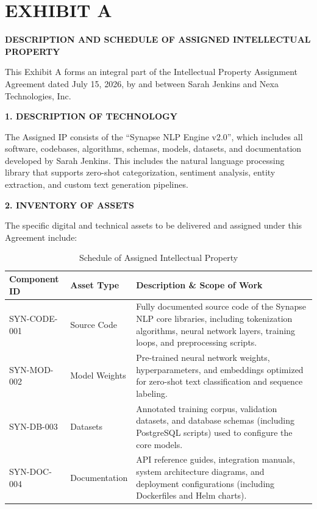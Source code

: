\section*{EXHIBIT A}
\begin{center}
  \textbf{\large DESCRIPTION AND SCHEDULE OF ASSIGNED INTELLECTUAL PROPERTY}
\end{center}

\vspace{1.5em}

This Exhibit A forms an integral part of the Intellectual Property Assignment Agreement dated July 15, 2026, by and between Sarah Jenkins and Nexa Technologies, Inc.

\vspace{1.5em}

\noindent\textbf{1. DESCRIPTION OF TECHNOLOGY}

The Assigned IP consists of the ``Synapse NLP Engine v2.0'', which includes all software, codebases, algorithms, schemas, models, datasets, and documentation developed by Sarah Jenkins. This includes the natural language processing library that supports zero-shot categorization, sentiment analysis, entity extraction, and custom text generation pipelines.

\vspace{1.5em}

\noindent\textbf{2. INVENTORY OF ASSETS}

The specific digital and technical assets to be delivered and assigned under this Agreement include:

\vspace{1.5em}

\begin{table}[h]
\centering
\sffamily
\fontsize{9}{11}\selectfont
\begin{tabularx}{\textwidth}{l l X}
\toprule
\textbf{Component ID} & \textbf{Asset Type} & \textbf{Description \& Scope of Work} \\
\midrule
SYN-CODE-001 & Source Code & Fully documented source code of the Synapse NLP core libraries, including tokenization algorithms, neural network layers, training loops, and preprocessing scripts. \\
SYN-MOD-002 & Model Weights & Pre-trained neural network weights, hyperparameters, and embeddings optimized for zero-shot text classification and sequence labeling. \\
SYN-DB-003 & Datasets & Annotated training corpus, validation datasets, and database schemas (including PostgreSQL scripts) used to configure the core models. \\
SYN-DOC-004 & Documentation & API reference guides, integration manuals, system architecture diagrams, and deployment configurations (including Dockerfiles and Helm charts). \\
\bottomrule
\end{tabularx}
\caption{Schedule of Assigned Intellectual Property}
\label{tab:assigned_ip}
\end{table}

